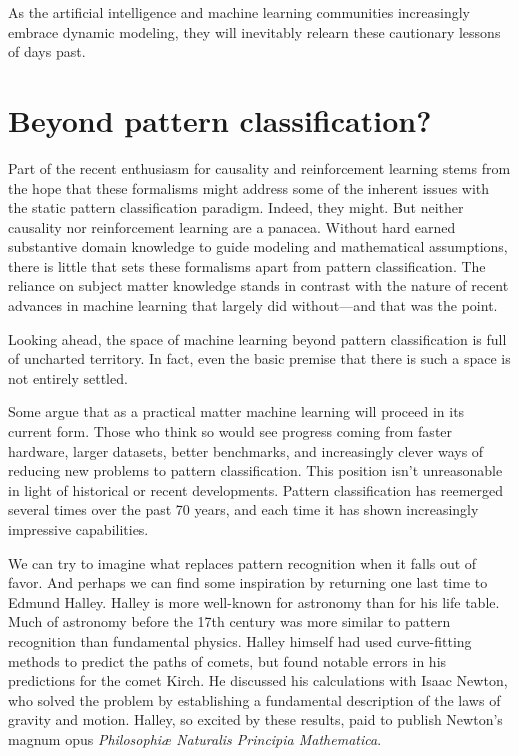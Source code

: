 \documentclass{tufte-book}
\begin{document}
As the artificial intelligence and machine learning communities
increasingly embrace dynamic modeling, they will inevitably relearn
these cautionary lessons of days past.

\hypertarget{beyond-pattern-classification}{%
\section{Beyond pattern
classification?}\label{beyond-pattern-classification}}

Part of the recent enthusiasm for causality and reinforcement learning
stems from the hope that these formalisms might address some of the
inherent issues with the static pattern classification paradigm. Indeed,
they might. But neither causality nor reinforcement learning are a
panacea. Without hard earned substantive domain knowledge to guide
modeling and mathematical assumptions, there is little that sets these
formalisms apart from pattern classification. The reliance on subject
matter knowledge stands in contrast with the nature of recent advances
in machine learning that largely did without---and that was the point.

Looking ahead, the space of machine learning beyond pattern
classification is full of uncharted territory. In fact, even the basic
premise that there is such a space is not entirely settled.

Some argue that as a practical matter machine learning will proceed in
its current form. Those who think so would see progress coming from
faster hardware, larger datasets, better benchmarks, and increasingly
clever ways of reducing new problems to pattern classification. This
position isn't unreasonable in light of historical or recent
developments. Pattern classification has reemerged several times over
the past 70 years, and each time it has shown increasingly impressive
capabilities.

We can try to imagine what replaces pattern recognition when it falls
out of favor. And perhaps we can find some inspiration by returning one
last time to Edmund Halley. Halley is more well-known for astronomy than
for his life table. Much of astronomy before the 17th century was more
similar to pattern recognition than fundamental physics. Halley himself
had used curve-fitting methods to predict the paths of comets, but found
notable errors in his predictions for the comet Kirch. He discussed his
calculations with Isaac Newton, who solved the problem by establishing a
fundamental description of the laws of gravity and motion. Halley, so
excited by these results, paid to publish Newton's magnum opus
\emph{Philosophiæ Naturalis Principia Mathematica}.
\end{document}
